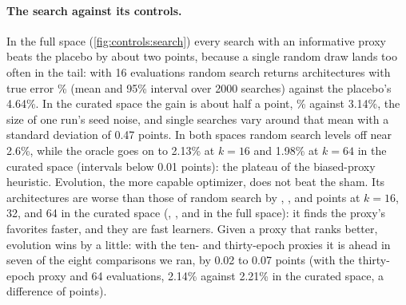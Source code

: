 \begin{refsection}
\paragraph{The search against its controls.} In the full space (\cref{fig:controls:search}) every search with an informative proxy beats the placebo by about two points, because a single random draw lands too often in the tail: with 16 evaluations random search returns architectures with true error \% (mean and 95\% interval over 2000 searches) against the placebo's 4.64\%. In the curated space the gain is about half a point, \% against 3.14\%, the size of one run's seed noise, and single searches vary around that mean with a standard deviation of 0.47 points. In both spaces random search levels off near 2.6\%, while the oracle goes on to 2.13\% at $k=16$ and 1.98\% at $k=64$ in the curated space (intervals below 0.01 points): the plateau of the biased-proxy heuristic. Evolution, the more capable optimizer, does not beat the sham. Its architectures are worse than those of random search by , , and  points at $k=16$, 32, and 64 in the curated space (, , and  in the full space): it finds the proxy's favorites faster, and they are fast learners. Given a proxy that ranks better, evolution wins by a little: with the ten- and thirty-epoch proxies it is ahead in seven of the eight comparisons we ran, by 0.02 to 0.07 points (with the thirty-epoch proxy and 64 evaluations, 2.14\% against 2.21\% in the curated space, a difference of  points).


\end{refsection}
